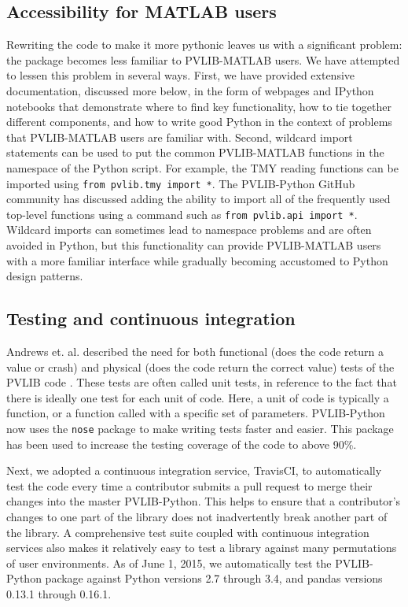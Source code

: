 \documentclass[conference]{IEEEtran}
\begin{document}
\subsection{Accessibility for MATLAB users}
Rewriting the code to make it more pythonic leaves us with a significant problem: the package becomes less familiar to PVLIB-MATLAB users. 
We have attempted to lessen this problem in several ways.
First, we have provided extensive documentation, discussed more below, in the form of webpages and IPython notebooks that demonstrate where to find key functionality, how to tie together different components, and how to write good Python in the context of problems that PVLIB-MATLAB users are familiar with.
Second, wildcard import statements can be used to put the common PVLIB-MATLAB functions in the namespace of the Python script. 
For example, the TMY reading functions can be imported using \texttt{from pvlib.tmy import *}.
The PVLIB-Python GitHub community has discussed adding the ability to import all of the frequently used top-level functions using a command such as \texttt{from pvlib.api import *}.
Wildcard imports can sometimes lead to namespace problems and are often avoided in Python, but this functionality can provide PVLIB-MATLAB users with a more familiar interface while gradually becoming accustomed to Python design patterns.

\subsection{Testing and continuous integration}

Andrews et. al. described the need for both functional (does the code return a value or crash) and physical (does the code return the correct value) tests of the PVLIB code \cite{andrews}.
These tests are often called unit tests, in reference to the fact that there is ideally one test for each unit of code.
Here, a unit of code is typically a function, or a function called with a specific set of parameters.
PVLIB-Python now uses the \texttt{nose} package \cite{nosetests} to make writing tests faster and easier.
This package has been used to increase the testing coverage of the code to above 90\%.

Next, we adopted a continuous integration service, TravisCI, to automatically test the code every time a contributor submits a pull request to merge their changes into the master PVLIB-Python.
This helps to ensure that a contributor's changes to one part of the library does not inadvertently break another part of the library.
A comprehensive test suite coupled with continuous integration services also makes it relatively easy to test a library against many permutations of user environments.
As of June 1, 2015, we automatically test the PVLIB-Python package against Python versions 2.7 through 3.4, and pandas versions 0.13.1 through 0.16.1.
\end{document}

